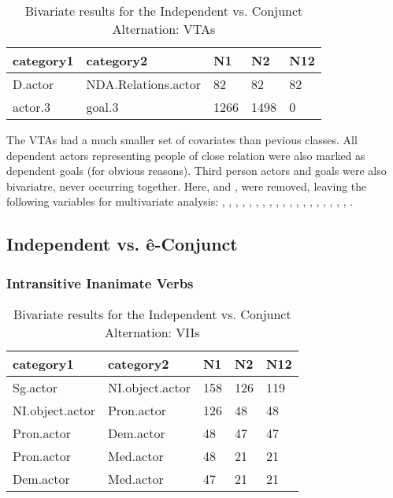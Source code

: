 \begin{table}[H]
\centering
\begin{tabular}{lllll}
\toprule
category1        & category2  & N1   & N2   & N12 \\
\midrule
D.actor & NDA.Relations.actor & 82 & 82 & 82 \\
actor.3 & goal.3 & 1266 & 1498 & 0 \\
\bottomrule
\end{tabular}
\caption{
   Bivariate results for the Independent vs. Conjunct Alternation: VTAs \\ \label{tab:tacnjuni}
  }
\end{table}

The VTAs had a much smaller set of covariates than pevious classes. All dependent actors representing people of close relation were also marked as dependent goals (for obvious reasons). Third person actors and goals were also bivariatre, never occurring together. Here,  and , were removed, leaving the following variables for multivariate analysis: , , , , , , , , , , , , , , , , , , , .



\subsection{Independent vs. ê-Conjunct}

\subsubsection{Intransitive Inanimate Verbs}
\FloatBarrier

\begin{table}[H]
\centering
\begin{tabular}{lllll}
\toprule
category1        & category2  & N1   & N2   & N12 \\
\midrule
Sg.actor & NI.object.actor & 158 & 126 & 119 \\
NI.object.actor & Pron.actor & 126 & 48 & 48 \\
Pron.actor & Dem.actor & 48 & 47 & 47 \\
Pron.actor & Med.actor & 48 & 21 & 21 \\
Dem.actor & Med.actor & 47 & 21 & 21 \\
\bottomrule
\end{tabular}
\caption{
   Bivariate results for the Independent vs. Conjunct Alternation: VIIs \\ \label{tab:iiindeuni}
  }
\end{table}


